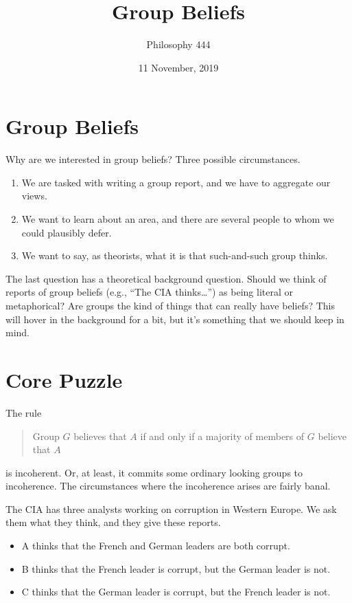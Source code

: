 \documentclass[11pt,]{article}
\title{Group Beliefs}
\author{Philosophy 444}
\date{11 November, 2019}
\providecommand{\tightlist}{%
  \setlength{\itemsep}{0pt}\setlength{\parskip}{0pt}}
\begin{document}
\maketitle

\hypertarget{group-beliefs}{%
\section{Group Beliefs}\label{group-beliefs}}

Why are we interested in group beliefs? Three possible circumstances.

\begin{enumerate}
\def\labelenumi{\arabic{enumi}.}
\tightlist
\item
  We are tasked with writing a group report, and we have to aggregate
  our views.
\item
  We want to learn about an area, and there are several people to whom
  we could plausibly defer.
\item
  We want to say, as theorists, what it is that such-and-such group
  thinks.
\end{enumerate}

The last question has a theoretical background question. Should we think
of reports of group beliefs (e.g., ``The CIA thinks\ldots{}'') as being
literal or metaphorical? Are groups the kind of things that can really
have beliefs? This will hover in the background for a bit, but it's
something that we should keep in mind.

\hypertarget{core-puzzle}{%
\section{Core Puzzle}\label{core-puzzle}}

The rule

\begin{quote}
Group \(G\) believes that \(A\) if and only if a majority of members of
\(G\) believe that \(A\)
\end{quote}

is incoherent. Or, at least, it commits some ordinary looking groups to
incoherence. The circumstances where the incoherence arises are fairly
banal.

The CIA has three analysts working on corruption in Western Europe. We
ask them what they think, and they give these reports.

\begin{itemize}
\tightlist
\item
  A thinks that the French and German leaders are both corrupt.
\item
  B thinks that the French leader is corrupt, but the German leader is
  not.
\item
  C thinks that the German leader is corrupt, but the French leader is
  not.
\end{itemize}
\end{document}
